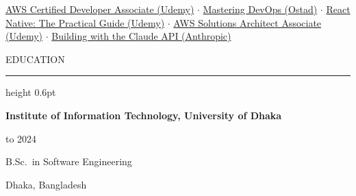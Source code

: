 \documentclass[a4paper,10pt]{article}
\newcommand{\cvsection}[1]{%
  \vspace{3pt}%
  {\color{accent}\fontsize{12}{13.5}\selectfont #1}\par
  \vspace{1pt}%
  {\color{rulegray}\hrule height 0.6pt}%
  \vspace{2pt}%
}
\newcommand{\cvline}[2]{%
  \noindent
  \begin{minipage}[t]{0.73\linewidth}\raggedright #1\end{minipage}%
  \hfill
  \begin{minipage}[t]{0.26\linewidth}\raggedleft #2\end{minipage}\par
}
\newcommand{\cvheading}[2]{\cvline{\fontsize{11}{13}\selectfont\bfseries #1}{\fontsize{10}{11.6}\selectfont #2}}
\newcommand{\cvrole}[2]{\vspace{0.5pt}\cvline{\fontsize{10}{11.6}\selectfont #1}{\fontsize{10}{11.6}\selectfont #2}}
\begin{document}
{\fontsize{10}{12}\selectfont
\href{https://www.udemy.com/certificate/UC-5644d052-45a5-420b-9888-cea3973fc3d0/}{AWS Certified Developer Associate (Udemy)}
$\cdot$
\href{https://ostad.app/share/certificate/c38498-md.-jubaer-hosain}{Mastering DevOps (Ostad)}
$\cdot$
\href{https://www.udemy.com/certificate/UC-b037a9da-e2db-477e-a7f5-2e28ac2a4c8d/}{React Native: The Practical Guide (Udemy)}
$\cdot$
\href{https://www.udemy.com/certificate/UC-b2345c4a-fb8f-46f5-a08d-db30bcf0c2b6/}{AWS Solutions Architect Associate (Udemy)}
$\cdot$
\href{https://verify.skilljar.com/c/uqss9jm5tspk}{Building with the Claude API (Anthropic)}
\par}

\cvsection{EDUCATION}

\cvheading{Institute of Information Technology, University of Dhaka}{2019 to 2024}
\cvrole{B.Sc.\ in Software Engineering}{Dhaka, Bangladesh}
\end{document}
